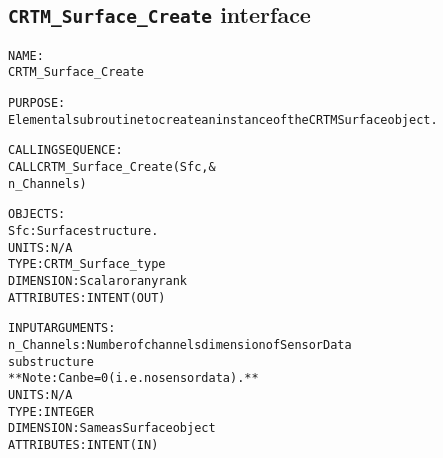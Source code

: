 \subsection{\texttt{CRTM\_Surface\_Create} interface}
  \label{sec:CRTM_Surface_Create_interface}
  \begin{alltt}
 
  NAME:
        CRTM_Surface_Create
 
  PURPOSE:
        Elemental subroutine to create an instance of the CRTM Surface object.
 
  CALLING SEQUENCE:
        CALL CRTM_Surface_Create( Sfc       , &
                                  n_Channels  )
 
  OBJECTS:
        Sfc:          Surface structure.
                      UNITS:      N/A
                      TYPE:       CRTM_Surface_type
                      DIMENSION:  Scalar or any rank
                      ATTRIBUTES: INTENT(OUT)
 
  INPUT ARGUMENTS:
        n_Channels:   Number of channels dimension of SensorData
                      substructure
                      ** Note: Can be = 0 (i.e. no sensor data). **
                      UNITS:      N/A
                      TYPE:       INTEGER
                      DIMENSION:  Same as Surface object
                      ATTRIBUTES: INTENT(IN)
 
  \end{alltt}
